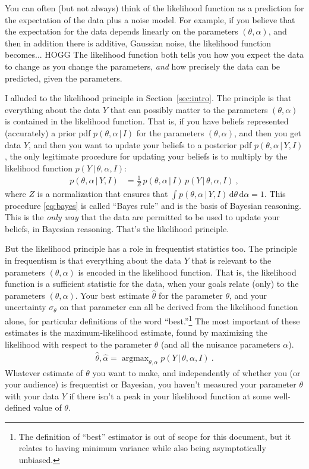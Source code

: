 \documentclass{article}
\newcommand{\sectionname}{Section}
\newcommand{\secref}[1]{\sectionname~\ref{#1}}
\newcommand{\dd}{\mathrm{d}}
\newcommand{\given}{\,|\,}
\DeclareMathOperator*{\argmax}{argmax}
\begin{document}
You can often (but not always) think of the likelihood function as a prediction for the expectation of the data plus a noise model.
For example, if you believe that the expectation for the data depends linearly on the parameters $(\theta, \alpha)$, and then in addition there is additive, Gaussian noise, the likelihood function becomes... HOGG
The likelihood function both tells you how you expect the data to change as you change the parameters, \emph{and} how precisely the data can be predicted, given the parameters.

I alluded to the likelihood principle in \secref{sec:intro}.
The principle is that everything about the data $Y$ that can possibly matter to the parameters $(\theta,\alpha)$ is contained in the likelihood function.
That is, if you have beliefs represented (accurately) a prior pdf $p(\theta,\alpha\given I)$ for the parameters $(\theta,\alpha)$,
and then you get data $Y$,
and then you want to update your beliefs to a posterior pdf $p(\theta,\alpha\given Y,I)$, the only legitimate procedure for updating your beliefs is to multiply by the likelihood function $p(Y\given\theta,\alpha,I)$:
\begin{align}
    p(\theta,\alpha\given Y,I) &= \frac{1}{Z}\,p(\theta,\alpha\given I)\,p(Y\given\theta,\alpha,I) ~,\label{eq:bayes}
\end{align}
where $Z$ is a normalization that ensures that $\int p(\theta,\alpha\given Y,I)\,\dd\theta\,\dd\alpha=1$.
This procedure \eqref{eq:bayes} is called ``Bayes rule'' and is the basis of Bayesian reasoning.
This is the \emph{only way} that the data are permitted to be used to update your beliefs, in Bayesian reasoning.
That's the likelihood principle.

But the likelihood principle has a role in frequentist statistics too.
The principle in frequentism is that everything about the data $Y$ that is relevant to the parameters $(\theta,\alpha)$ is encoded in the likelihood function.
That is, the likelihood function is a sufficient statistic for the data, when your goals relate (only) to the parameters $(\theta,\alpha)$.
Your best estimate $\hat{\theta}$ for the parameter $\theta$, and your uncertainty $\sigma_\theta$ on that parameter can all be derived from the likelihood function alone, for particular definitions of the word ``best.''\footnote{%
The definition of ``best'' estimator is out of scope for this document, but it relates to having minimum variance while also being asymptotically unbiased.}
The most important of these estimates is the maximum-likelihood estimate, found by maximizing the likelihood with respect to the parameter $\theta$ (and all the nuisance parameters $\alpha$).
\begin{align}
    \hat{\theta},\hat{\alpha} = \argmax_{\theta,\alpha} p(Y\given\theta,\alpha,I) ~.
\end{align}
Whatever estimate of $\theta$ you want to make, and independently of whether you (or your audience) is frequentist or Bayesian, you haven't measured your parameter $\theta$ with your data $Y$ if there isn't a peak in your likelihood function at some well-defined value of $\theta$.
\end{document}

